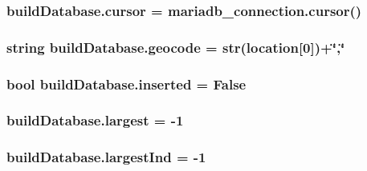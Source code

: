 \subsubsection[{\texorpdfstring{cursor}{cursor}}]{\setlength{\rightskip}{0pt plus 5cm}build\+Database.\+cursor = mariadb\+\_\+connection.\+cursor()}\hypertarget{namespacebuildDatabase_ad7b3e488c85e92658c04ac329ded4206}{}\label{namespacebuildDatabase_ad7b3e488c85e92658c04ac329ded4206}
\subsubsection[{\texorpdfstring{geocode}{geocode}}]{\setlength{\rightskip}{0pt plus 5cm}string build\+Database.\+geocode = str({\bf location}\mbox{[}0\mbox{]})+\char`\"{},\char`\"{}}\hypertarget{namespacebuildDatabase_ac6de86e53e5b1e858c4bfc30606561e0}{}\label{namespacebuildDatabase_ac6de86e53e5b1e858c4bfc30606561e0}
\subsubsection[{\texorpdfstring{inserted}{inserted}}]{\setlength{\rightskip}{0pt plus 5cm}bool build\+Database.\+inserted = False}\hypertarget{namespacebuildDatabase_ab9d82862a48f7e4e725a899047b7ee75}{}\label{namespacebuildDatabase_ab9d82862a48f7e4e725a899047b7ee75}
\subsubsection[{\texorpdfstring{largest}{largest}}]{\setlength{\rightskip}{0pt plus 5cm}build\+Database.\+largest = -\/1}\hypertarget{namespacebuildDatabase_a1a68c0e0f8d22d281ad1a8b9024fd5d1}{}\label{namespacebuildDatabase_a1a68c0e0f8d22d281ad1a8b9024fd5d1}
\subsubsection[{\texorpdfstring{largest\+Ind}{largestInd}}]{\setlength{\rightskip}{0pt plus 5cm}build\+Database.\+largest\+Ind = -\/1}\hypertarget{namespacebuildDatabase_abfd839e1a537e9e0ca132979eee02a28}{}\label{namespacebuildDatabase_abfd839e1a537e9e0ca132979eee02a28}
